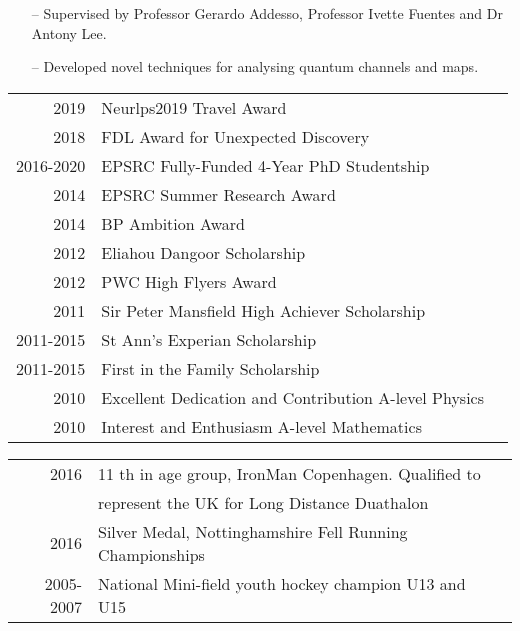 \documentclass[10pt,a4paper]{altacv}
\begin{document}

\begin{itemize}
    \setlength{\itemindent}{0.5em}
    \item[--]   \small{Supervised by Professor Gerardo Addesso, Professor Ivette Fuentes and Dr Antony Lee.}
    \item[--]   \small{Developed novel techniques for analysing quantum channels and maps.}
\end{itemize}

\medskip





\begin{tabular}{rll}
   2019 & Neurlps2019 Travel Award \\
   2018 & FDL Award for Unexpected Discovery \\
   2016-2020 & EPSRC Fully-Funded 4-Year PhD Studentship \\
   2014 & EPSRC Summer Research Award \\
   2014 & BP Ambition Award \\
   2012 & Eliahou Dangoor Scholarship \\
   2012 & PWC High Flyers Award \\
   2011 & Sir Peter Mansfield High Achiever Scholarship \\
   2011-2015 & St Ann's Experian Scholarship \\
   2011-2015 & First in the Family Scholarship \\
   2010 & Excellent Dedication and Contribution A-level Physics \\
   2010 & Interest and Enthusiasm A-level Mathematics
   
\end{tabular}

\divider

%



\begin{tabular}{rll}
2016 & 11 th in age group, IronMan Copenhagen. Qualified to \\
& represent the UK for Long Distance Duathalon  \\
2016 & Silver Medal, Nottinghamshire Fell Running Championships  \\
2005-2007 & National Mini-field youth hockey champion U13 and U15
\end{tabular}
\end{document}

